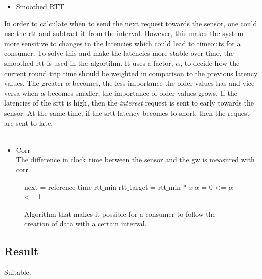 \begin{itemize}
\item Smoothed RTT
\end{itemize}
In order to calculate when to send the next request towards the sensor, one could use the rtt and subtract it from the interval. 
However, this makes the system more sensitive to changes in the latencies which could lead to timeouts for a consumer. To solve this and make the latencies more stable over time, the smoothed rtt is used in the algortihm. It uses a factor, $\alpha$, to decide how the current round trip time should be weighted in comparison to the previous latency values. The greater $\alpha$ becomes, the less importance the older values has and vice versa when $\alpha$ becomes smaller, the importance of older values grows.
If the latencies of the srtt is high, then the \textit{interest} request is sent to early towards the sensor. At the same time, if the srtt latency becomes to short, then the request are sent to late.\\\\
\begin{itemize}
\item Corr \\
	The difference in clock time between the sensor and the gw is measured with corr.
\end{itemize}

   
\begin{figure}
\begin{algorithm}[H]
 next = reference time\;
 rtt$\_$min\;
 rtt$\_$target = rtt$\_$min * \textit{x}\;
 $\alpha$ = 0 <= $\alpha$ <= 1\;

\end{algorithm}
\caption{Algorithm that makes it possible for a consumer to follow the creation of data with a certain interval.}
    \label{fig:onetime}
\end{figure}


\subsection{Result}
Suitable.

